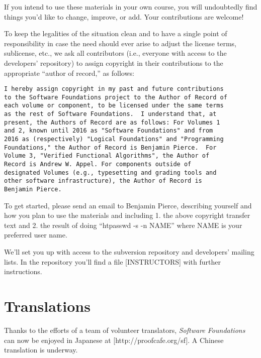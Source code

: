 If you intend to use these materials in your own course, you will
undoubtedly find things you'd like to change, improve, or add. Your
contributions are welcome!

To keep the legalities of the situation clean and to have a single point
of responsibility in case the need should ever arise to adjust the
license terms, sublicense, etc., we ask all contributors (i.e., everyone
with access to the developers' repository) to assign copyright in their
contributions to the appropriate ``author of record,'' as follows:

\begin{verbatim}
I hereby assign copyright in my past and future contributions
to the Software Foundations project to the Author of Record of
each volume or component, to be licensed under the same terms
as the rest of Software Foundations.  I understand that, at
present, the Authors of Record are as follows: For Volumes 1
and 2, known until 2016 as "Software Foundations" and from
2016 as (respectively) "Logical Foundations" and "Programming
Foundations," the Author of Record is Benjamin Pierce.  For
Volume 3, "Verified Functional Algorithms", the Author of
Record is Andrew W. Appel. For components outside of
designated Volumes (e.g., typesetting and grading tools and
other software infrastructure), the Author of Record is
Benjamin Pierce.
\end{verbatim}

To get started, please send an email to Benjamin Pierce, describing
yourself and how you plan to use the materials and including 1. the
above copyright transfer text and 2. the result of doing ``htpasswd -s
-n NAME'' where NAME is your preferred user name.

We'll set you up with access to the subversion repository and
developers' mailing lists. In the repository you'll find a file
{[}INSTRUCTORS{]} with further instructions.

\section{Translations}\label{translations}

Thanks to the efforts of a team of volunteer translators, \emph{Software
Foundations} can now be enjoyed in Japanese at
{[}http://proofcafe.org/sf{]}. A Chinese translation is underway.
